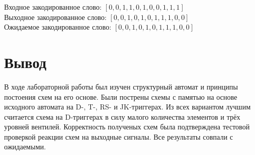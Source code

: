 \documentclass[a4paper,10pt]{article}
\begin{document}
        Входное закодированное слово: $[0,0,1,1,0,1,0,0,1,1,1]$\\
        Выходное закодированное слово: $[0,0,1,0,1,0,1,1,1,0,0]$ \\
        Ожидаемое закодированное слово: $[0,0,1,0,1,0,1,1,1,0,0]$

\section*{Вывод}
В ходе лабораторной работы был изучен структурный автомат и принципы постоения схем на его основе.
Были пострены схемы с памятью на основе исходного автомата на D-, T-, RS- и JK-триггерах. Из всех
вариантом лучшим считается схема на D-триггерах в силу малого количества элементов и трёх уровней
вентилей. Корректность полученых схем была подтверждена тестовой проверкой реакции
схем на выходные сигналы. Все результаты совпали с ожидаемыми.
\end{document}

